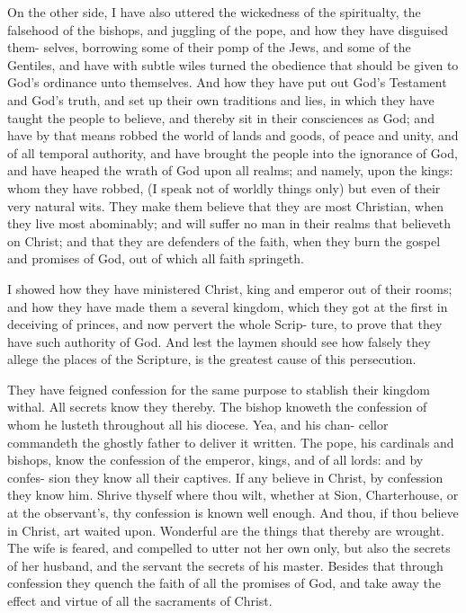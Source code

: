 \documentclass{custom}
\begin{document}
On the other side, I have also uttered the wickedness 
of the spiritualty, the falsehood of the bishops, and 
juggling of the pope, and how they have disguised them- 
selves, borrowing some of their pomp of the Jews, and 
some of the Gentiles, and have with subtle wiles turned 
the obedience that should be given to God's ordinance unto 
themselves. And how they have put out God's Testament 
and God's truth, and set up their own traditions and lies, 
in which they have taught the people to believe, and thereby 
sit in their consciences as God; and have by that means 
robbed the world of lands and goods, of peace and unity, 
and of all temporal authority, and have brought the people 
into the ignorance of God, and have heaped the wrath of 
God upon all realms; and namely, upon the kings: 
whom they have robbed, (I speak not of worldly things 
only) but even of their very natural wits. They make 
them believe that they are most Christian, when they live 
most abominably; and will suffer no man in their realms 
that believeth on Christ; and that they are defenders of 
the faith, when they burn the gospel and promises of God, 
out of which all faith springeth. 

I showed how they have ministered Christ, king and 
emperor out of their rooms; and how they have made 
them a several kingdom, which they got at the first in 
deceiving of princes, and now pervert the whole Scrip- 
ture, to prove that they have such authority of God. 
And lest the laymen should see how falsely they allege 
the places of the Scripture, is the greatest cause of this 
persecution. 

They have feigned confession for the same purpose to 
stablish their kingdom withal. All secrets know they 
thereby. The bishop knoweth the confession of whom 
he lusteth throughout all his diocese. Yea, and his chan- 
cellor commandeth the ghostly father to deliver it written. 
The pope, his cardinals and bishops, know the confession 
of the emperor, kings, and of all lords: and by confes- 
sion they know all their captives. If any believe in Christ, 
by confession they know him. Shrive thyself where thou 
wilt, whether at Sion, Charterhouse, or at the observant's, 
thy confession is known well enough. And thou, if thou 
believe in Christ, art waited upon. Wonderful are the 
things that thereby are wrought. The wife is feared, and 
compelled to utter not her own only, but also the secrets 
of her husband, and the servant the secrets of his master. 
Besides that through confession they quench the faith of 
all the promises of God, and take away the effect and 
virtue of all the sacraments of Christ. 
\end{document}
